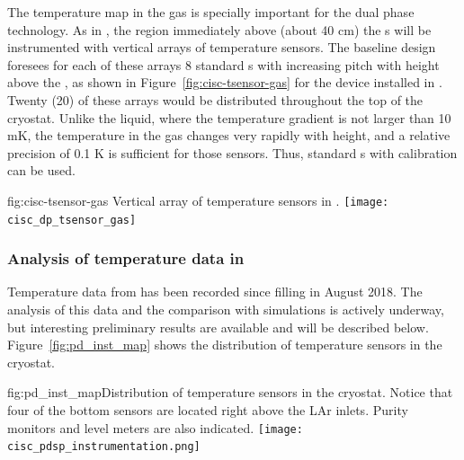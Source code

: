 The temperature map in the gas is specially important for the dual phase technology. 
As in , the region immediately above (about 40 cm) the s will be instrumented with vertical arrays of temperature sensors.  The baseline design foresees for each of these arrays 8 standard s with increasing pitch with height above the , as shown in Figure~\ref{fig:cisc-tsensor-gas} for the device installed in . Twenty (20) of these arrays would be distributed throughout the top of the cryostat. Unlike the liquid, where the temperature gradient is not larger than 10 mK, the temperature in the gas changes very rapidly with height, and a relative precision of 0.1 K is sufficient for those sensors. Thus, standard s with calibration can be used.    

\begin{dunefigure}{fig:cisc-tsensor-gas}
  {Vertical array of temperature sensors in .
  }
 \texttt{[image: cisc\_dp\_tsensor\_gas]}
\end{dunefigure}

\subsubsection{Analysis of temperature data in }
\label{sec:fdgen-slow-cryo-temp-ana}


Temperature data from  has been recorded since  filling %
in August 2018. The analysis of this data and the comparison with  simulations is actively underway, but interesting preliminary results are available and will be described below. Figure~\ref{fig:pd_inst_map} shows the distribution of temperature sensors in the  cryostat.  

\begin{dunefigure}{fig:pd_inst_map}{Distribution of temperature sensors in the  cryostat. Notice that four of the bottom sensors are located right above the LAr inlets. Purity monitors and level meters are also indicated. }
  \texttt{[image: cisc\_pdsp\_instrumentation.png]}%
\end{dunefigure}


